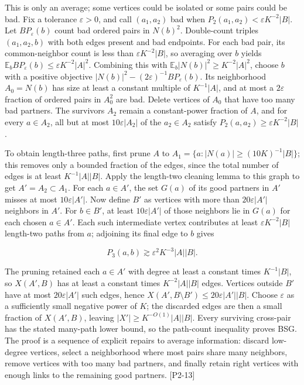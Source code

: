 This is only an average; some vertices could be isolated or some pairs could be bad. Fix a tolerance \(\varepsilon>0\), and call \((a_1,a_2)\) bad when \(P_2(a_1,a_2)<\varepsilon K^{-2}|B|\). Let \(BP_\varepsilon(b)\) count bad ordered pairs in \(N(b)^2\). Double-count triples \((a_1,a_2,b)\) with both edges present and bad endpoints. For each bad pair, its common-neighbor count is less than \(\varepsilon K^{-2}|B|\), so averaging over \(b\) yields \(\mathbb E_b BP_\varepsilon(b)\le\varepsilon K^{-2}|A|^2\). Combining this with \(\mathbb E_b|N(b)|^2\ge K^{-2}|A|^2\), choose \(b\) with a positive objective \(|N(b)|^2-(2\varepsilon)^{-1}BP_\varepsilon(b)\). Its neighborhood \(A_0=N(b)\) has size at least a constant multiple of \(K^{-1}|A|\), and at most a \(2\varepsilon\) fraction of ordered pairs in \(A_0^2\) are bad. Delete vertices of \(A_0\) that have too many bad partners. The survivors \(A_2\) remain a constant-power fraction of \(A\), and for every \(a\in A_2\), all but at most \(10\varepsilon|A_2|\) of the \(a_2\in A_2\) satisfy \(P_2(a,a_2)\ge\varepsilon K^{-2}|B|\).

To obtain length-three paths, first prune \(A\) to \(A_1=\{a:|N(a)|\ge (10K)^{-1}|B|\}\); this removes only a bounded fraction of the edges, since the total number of edges is at least \(K^{-1}|A||B|\). Apply the length-two cleaning lemma to this graph to get \(A'=A_2\subset A_1\). For each \(a\in A'\), the set \(G(a)\) of its good partners in \(A'\) misses at most \(10\varepsilon|A'|\). Now define \(B'\) as vertices with more than \(20\varepsilon|A'|\) neighbors in \(A'\). For \(b\in B'\), at least \(10\varepsilon|A'|\) of those neighbors lie in \(G(a)\) for each chosen \(a\in A'\). Each such intermediate vertex contributes at least \(\varepsilon K^{-2}|B|\) length-two paths from \(a\); adjoining its final edge to \(b\) gives

\[P_3(a,b)\gtrsim \varepsilon^2K^{-3}|A||B|.\]

The pruning retained each \(a\in A'\) with degree at least a constant times \(K^{-1}|B|\), so \(X(A',B)\) has at least a constant times \(K^{-2}|A||B|\) edges. Vertices outside \(B'\) have at most \(20\varepsilon|A'|\) such edges, hence \(X(A',B\setminus B')\le20\varepsilon|A'||B|\). Choose \(\varepsilon\) as a sufficiently small negative power of \(K\); the discarded edges are then a small fraction of \(X(A',B)\), leaving \(|X'|\ge K^{-O(1)}|A||B|\). Every surviving cross-pair has the stated many-path lower bound, so the path-count inequality proves BSG. The proof is a sequence of explicit repairs to average information: discard low-degree vertices, select a neighborhood where most pairs share many neighbors, remove vertices with too many bad partners, and finally retain right vertices with enough links to the remaining good partners. {[}P2-13{]}

